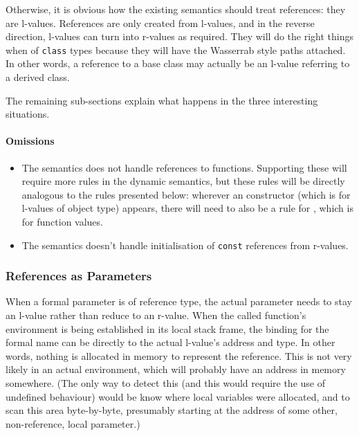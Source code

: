 \documentclass[11pt]{article}
\begin{document}
Otherwise, it is obvious how the existing semantics should treat
references: they are l-values.  References are only created from
l-values, and in the reverse direction, l-values can turn into
r-values as required.  They will do the right things when of
\texttt{class} types because they will have the Wasserrab style paths
attached.  In other words, a reference to a base class may actually be
an l-value referring to a derived class.

The remaining sub-sections explain what happens in the three
interesting situations.

\paragraph{Omissions}
\begin{itemize}
\item The semantics does not handle references to functions.
  Supporting these will require more rules in the dynamic semantics,
  but these rules will be directly analogous to the rules presented
  below: wherever an \clvalue{} constructor (which is for l-values of
  object type) appears, there will need to also be a rule for
  \cfvalue{}, which is for function values.
\item The semantics doesn't handle initialisation of \texttt{const}
  references from r-values.
\end{itemize}


\subsubsection{References as Parameters}

When a formal parameter is of reference type, the actual parameter
needs to stay an l-value rather than reduce to an r-value.  When the
called function's environment is being established in its local stack
frame, the binding for the formal name can be directly to the actual
l-value's address and type.  In other words, nothing is allocated in
memory to represent the reference.  This is not very likely in an
actual environment, which will probably have an address in memory
somewhere.  (The only way to detect this (and this would require the
use of undefined behaviour) would be know where local variables were
allocated, and to scan this area byte-by-byte, presumably starting at
the address of some other, non-reference, local parameter.)
\end{document}
